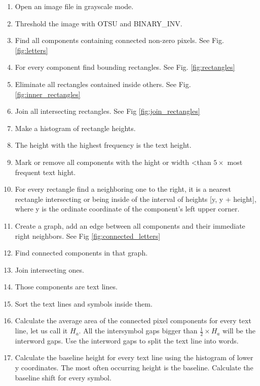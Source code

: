 \documentclass{article}
\begin{document}
\begin{enumerate}
\item Open an image file in grayscale mode.
\item Threshold the image with OTSU and BINARY\_INV.
\item Find all components containing connected non-zero pixels. See Fig. \ref{fig:letters}
\item For every component find bounding rectangles. See Fig. \ref{fig:rectangles}
\item Eliminate all rectangles contained inside others. See Fig. \ref{fig:inner_rectangles}
\item Join all intersecting rectangles. See Fig \ref{fig:join_rectangles}
\item Make a histogram of rectangle heights.
\item The height with the highest frequency is the text height.
\item Mark or remove all components with the hight or width \textless than $ 5 \times $ most frequent text hight.
\item For every rectangle find a neighboring one to the right, it is a nearest rectangle  intersecting or being inside of the interval of heights [y, y + height], where y is the ordinate coordinate of the component's left upper corner.
\item Create a graph, add an edge between all components and their immediate right neighbors. See Fig \ref{fig:connected_letters}
\item Find connected components in that graph.
\item Join intersecting ones.
\item Those components are text lines.
\item Sort the text lines and symbols inside them.
\item Calculate the average area of the connected pixel components for every text line, let us call it $H_a$. All the intersymbol gaps bigger than $\frac{1}{2} \times H_a$ will be the interword gaps. Use the interword gaps to split the text line into words.
\item Calculate the baseline height for every text line using the histogram of lower y coordinates. The most often occurring height is the baseline. Calculate the baseline shift for every symbol.

\end{enumerate}
\end{document}
